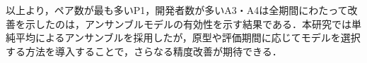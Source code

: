 \documentclass[submit,noauthor,ses,dvipdfmx]{ipsj}
\newcommand{\todo}[1]{\colorbox{yellow}{{\bf TODO}:}{\color{red} {\textbf{[#1]}}}}
\begin{document}
以上より，ペア数が最も多いP1，開発者数が多いA3・A4は全期間にわたって改善を示したのは，アンサンブルモデルの有効性を示す結果である．本研究では単純平均によるアンサンブルを採用したが，原型や評価期間に応じてモデルを選択する方法を導入することで，さらなる精度改善が期待できる．


\end{document}
